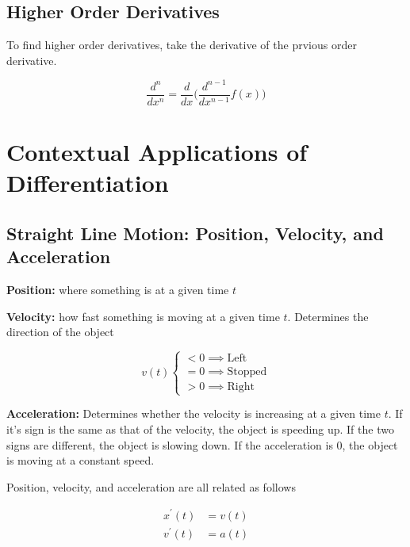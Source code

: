 \documentclass[12pt]{article}
\begin{document}
        \subsection{Higher Order Derivatives}

        To find higher order derivatives, take the derivative of the prvious order derivative. 

        \[
            \frac{d^n}{dx^n} = \frac{d}{dx}\bigg(\frac{d^{n-1}}{dx^{n-1}} f(x)\bigg)   
        \]

        \section{Contextual Applications of Differentiation}

        \subsection{Straight Line Motion: Position, Velocity, and Acceleration}

        \noindent\textbf{Position: } where something is at a given time $t$

        \noindent\textbf{Velocity: } how fast something is moving at a given time $t$. Determines 
        the direction of the object

        \[
            v(t) \begin{cases}
                < 0 \implies \text{Left} \\
                = 0 \implies \text{Stopped} \\
                > 0 \implies \text{Right}
            \end{cases}    
        \]

        \noindent\textbf{Acceleration: } Determines whether the velocity is increasing at a given time $t$. 
        If it's sign is the same as that of the velocity, the object is speeding up. If the two signs are different, the
        object is slowing down. If the acceleration is 0, the object is moving at a constant speed. 

        Position, velocity, and acceleration are all related as follows

        \[
            \begin{aligned}
                x^{\prime}(t) &= v(t) \\
                v^{\prime}(t) &= a(t) \\
            \end{aligned}    
        \]
\end{document}
